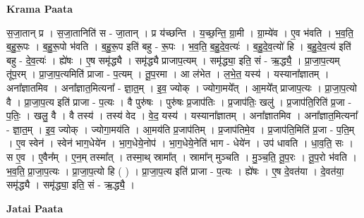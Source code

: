 \documentclass[17pt]{extarticle}
\begin{document}
\textbf{Krama Paata} \newline

स॒जा॒तान् प्र । स॒जा॒तानिति॑ स - जा॒तान् । प्र य॑च्छन्ति । य॒च्छ॒न्ति॒ ग्रा॒मी । ग्रा॒म्ये॑व । ए॒व भ॑वति । भ॒व॒ति॒ ब॒हु॒रू॒पः । ब॒हु॒रू॒पो भ॑वति । ब॒हु॒रू॒प इति॑ बहु - रू॒पः । भ॒व॒ति॒ ब॒हु॒दे॒व॒त्यः॑ । ब॒हु॒दे॒व॒त्यो॑ हि । ब॒हु॒दे॒व॒त्य॑ इति॑ बहु - दे॒व॒त्यः॑ । ह्ये॑षः । ए॒ष समृ॑द्ध्यै । समृ॑द्ध्यै प्राजाप॒त्यम् । समृ॑द्ध्या॒ इति॒ सं - ऋ॒द्ध्यै॒ । प्रा॒जा॒प॒त्यम् तू॑प॒रम् । प्रा॒जा॒प॒त्यमिति॑ प्राजा - प॒त्यम् । तू॒प॒रमा । आ ल॑भेत । ल॒भे॒त॒ यस्य॑ । यस्याना᳚ज्ञातम् । अना᳚ज्ञातमिव । अना᳚ज्ञात॒मित्यना᳚ - ज्ञा॒त॒॒म् । इ॒व॒ ज्योक् । ज्योगा॒मये᳚त् । आ॒मये᳚त् प्राजाप॒त्यः । प्रा॒जा॒प॒त्यो वै । प्रा॒जा॒प॒त्य इति॑ प्राजा - प॒त्यः । वै पुरु॑षः । पुरु॑षः प्र॒जाप॑तिः । प्र॒जाप॑तिः॒ खलु॑ । प्र॒जाप॑ति॒रिति॑ प्र॒जा - प॒तिः॒ । खलु॒ वै । वै तस्य॑ । तस्य॑ वेद । वे॒द॒ यस्य॑ । यस्याना᳚ज्ञातम् । अना᳚ज्ञातमिव । अना᳚ज्ञात॒मित्यना᳚ - ज्ञा॒त॒॒म् । इ॒व॒ ज्योक् । ज्योगा॒मय॑ति । आ॒मय॑ति प्र॒जाप॑तिम् । प्र॒जाप॑तिमे॒व । प्र॒जाप॑ति॒मिति॑ प्र॒जा - प॒ति॒म् । ए॒व स्वेन॑ । स्वेन॑ भाग॒धेये॑न । भा॒ग॒धेये॒नोप॑ । भा॒ग॒धेये॒नेति॑ भाग - धेये॑न । उप॑ धावति । धा॒व॒ति॒ सः । स ए॒व । ए॒वैन᳚म् । ए॒न॒म् तस्मा᳚त् । तस्मा॒थ् स्रामा᳚त् । स्रामा᳚न् मुञ्चति । मु॒ञ्च॒ति॒ तू॒प॒रः । तू॒प॒रो भ॑वति । भ॒व॒ति॒ प्रा॒जा॒प॒त्यः । प्रा॒जा॒प॒त्यो हि ( ) । प्रा॒जा॒प॒त्य इति॑ प्राजा - प॒त्यः । ह्ये॑षः । ए॒ष दे॒वत॑या । दे॒वत॑या॒ समृ॑द्ध्यै । 
समृ॑द्ध्या॒ इति॒ सं - ऋ॒द्ध्यै॒ । \newline

\textbf{Jatai Paata} \newline
\end{document}

